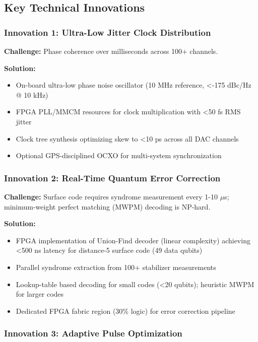 \documentclass[12pt,a4paper]{article}
\begin{document}
\subsection{Key Technical Innovations}

\subsubsection{Innovation 1: Ultra-Low Jitter Clock Distribution}

\textbf{Challenge:} Phase coherence over milliseconds across 100+ channels.

\textbf{Solution:}
\begin{itemize}[leftmargin=*]
    \item On-board ultra-low phase noise oscillator (10 MHz reference, <-175 dBc/Hz @ 10 kHz)
    \item FPGA PLL/MMCM resources for clock multiplication with <50 fs RMS jitter
    \item Clock tree synthesis optimizing skew to <10 ps across all DAC channels
    \item Optional GPS-disciplined OCXO for multi-system synchronization
\end{itemize}

\subsubsection{Innovation 2: Real-Time Quantum Error Correction}

\textbf{Challenge:} Surface code requires syndrome measurement every 1-10 $\mu$s; minimum-weight perfect matching (MWPM) decoding is NP-hard.

\textbf{Solution:}
\begin{itemize}[leftmargin=*]
    \item FPGA implementation of Union-Find decoder (linear complexity) achieving <500 ns latency for distance-5 surface code (49 data qubits)
    \item Parallel syndrome extraction from 100+ stabilizer measurements
    \item Lookup-table based decoding for small codes (<20 qubits); heuristic MWPM for larger codes
    \item Dedicated FPGA fabric region (30\% logic) for error correction pipeline
\end{itemize}

\subsubsection{Innovation 3: Adaptive Pulse Optimization}
\end{document}
